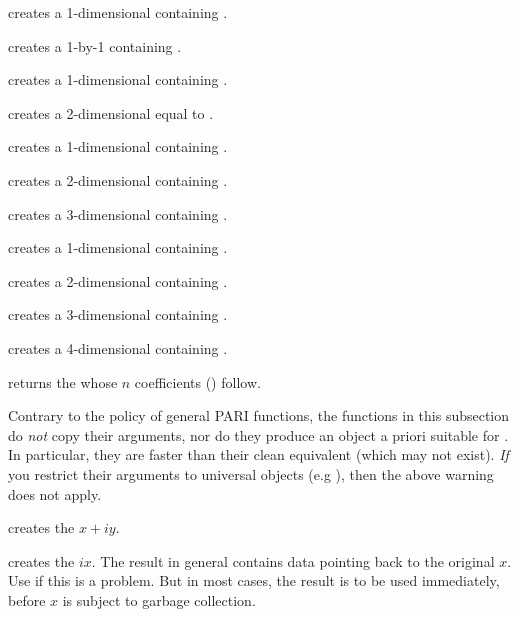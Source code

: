  creates a 1-dimensional  containing
.

 creates a 1-by-1  containing .

 creates a 1-dimensional  containing
.

 creates a 2-dimensional  equal
to \kbd{[x,y]}.

 creates a 1-dimensional 
containing .

 creates a 2-dimensional 
containing .

 creates a 3-dimensional 
containing .

 creates a 1-dimensional 
containing .

 creates a 2-dimensional 
containing \kbd{[x, y]}.

 creates a 3-dimensional
 containing \kbd{[x, y, z]}.

 creates a 4-dimensional
 containing \kbd{[x, y, z, t]}.

 returns the  whose $n$
coefficients () follow.

\label{se:unclean}

Contrary to the policy of general PARI functions, the functions in this
subsection do \emph{not} copy their arguments, nor do they produce an object
a priori suitable for . In particular, they are
faster than their clean equivalent (which may not exist). \emph{If} you
restrict their arguments to universal objects (e.g ),
then the above warning does not apply.

 creates the  $x + iy$.

 creates the  $ix$. The result in
general contains data pointing back to the original $x$. Use  if
this is a problem. But in most cases, the result is to be used immediately,
before $x$ is subject to garbage collection.


